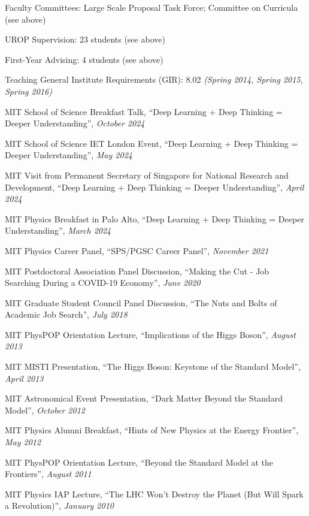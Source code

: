 \item Faculty Committees: Large Scale Proposal Task Force; Committee on Curricula (see above) 
\item UROP Supervision: 23 students (see above) 
\item First-Year Advising: 4 students (see above) 
\item Teaching General Institute Requirements (GIR):  8.02 \emph{(Spring 2014, Spring 2015, Spring 2016)}
\item MIT School of Science Breakfast Talk, ``Deep Learning + Deep Thinking = Deeper Understanding'', \emph{October 2024}
\item MIT School of Science IET London Event, ``Deep Learning + Deep Thinking = Deeper Understanding'', \emph{May 2024}
\item MIT Visit from Permanent Secretary of Singapore for National Research and Development, ``Deep Learning + Deep Thinking = Deeper Understanding'', \emph{April 2024}
\item MIT Physics Breakfast in Palo Alto, ``Deep Learning + Deep Thinking = Deeper Understanding'', \emph{March 2024}
\item MIT Physics Career Panel, ``SPS/PGSC Career Panel'', \emph{November 2021}
\item MIT Postdoctoral Association Panel Discussion, ``Making the Cut - Job Searching During a COVID-19 Economy'', \emph{June 2020}
\item MIT Graduate Student Council Panel Discussion, ``The Nuts and Bolts of Academic Job Search'', \emph{July 2018}
\item MIT PhysPOP Orientation Lecture, ``Implications of the Higgs Boson'', \emph{August 2013}
\item MIT MISTI Presentation, ``The Higgs Boson: Keystone of the Standard Model'', \emph{April 2013}
\item MIT Astronomical Event Presentation, ``Dark Matter Beyond the Standard Model'', \emph{October 2012}
\item MIT Physics Alumni Breakfast, ``Hints of New Physics at the Energy Frontier'', \emph{May 2012}
\item MIT PhysPOP Orientation Lecture, ``Beyond the Standard Model at the Frontiers'', \emph{August 2011}
\item MIT Physics IAP Lecture, ``The LHC Won’t Destroy the Planet (But Will Spark a Revolution)'', \emph{January 2010}
